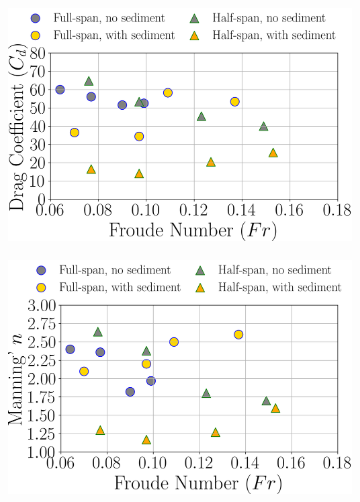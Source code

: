 \documentclass[preview, border=2pt]{standalone}
\begin{document}
\begin{figure}
     \centering
     \begin{subfigure}[b]{0.48\textwidth}
         \centering
         \caption{}
         \includegraphics[width=\textwidth]{Cd_Fr_dependence_all_cases.png}
     \end{subfigure}
     \hfill     
     \begin{subfigure}[b]{0.48\textwidth}
         \centering
         \caption{}
         \includegraphics[width=\textwidth]{ManningN_Fr_dependence_all_cases.png}
     \end{subfigure}
     \hfill     
     \begin{subfigure}[b]{0.48\textwidth}
         \centering
         \caption{}

\end{subfigure}
\end{figure}
\end{document}
